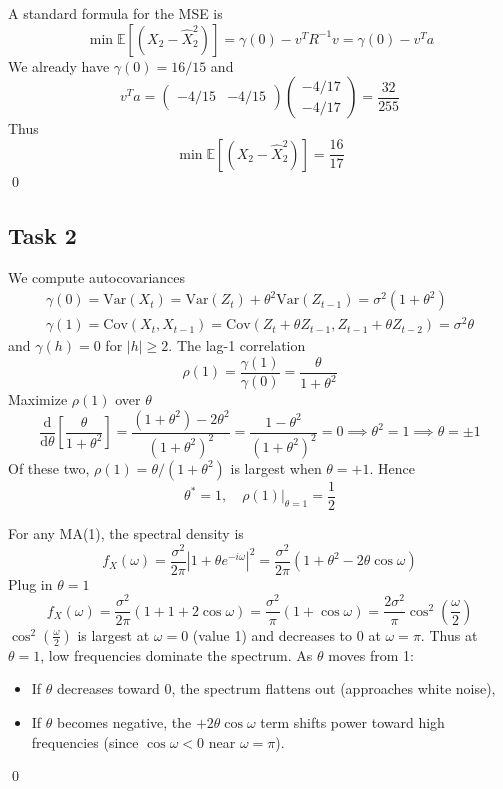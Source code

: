 \documentclass[11pt,a4paper]{article}
\newcommand{\EE}{\mathbb E}
\newcommand{\var}{\mathrm{Var}}
\newcommand{\cov}{\mathrm{Cov}}
\begin{document}
    A standard formula for the MSE is 
    \[ \min \EE [(X_2 - \hat X_2^2)] = \gamma(0) - v^T R^{-1} v = \gamma(0) - v^T a \]
    We already have $\gamma(0) = 16/15$ and
    \[ v^T a = \begin{pmatrix} -4/15 & -4/15 \end{pmatrix} \begin{pmatrix} -4/17 \\ -4/17 \end{pmatrix} = \frac{32}{255} \]
    Thus
    \[ \min \EE[(X_2 - \hat X_2^2)] = \frac{16}{17} \] \qed

    \subsection*{Task 2}
    We compute autocovariances
    \begin{align*}
        \gamma(0) = \var(X_t) = \var(Z_t) + \theta^2 \var(Z_{t-1}) = \sigma^2 (1+\theta^2) \\
        \gamma(1) = \cov(X_t, X_{t-1}) = \cov(Z_t + \theta Z_{t-1}, Z_{t-1} + \theta Z_{t-2}) = \sigma^2 \theta
    \end{align*}
    and $\gamma(h) = 0$ for $|h| \ge 2$. The lag-1 correlation
    \[ \rho(1) = \frac{\gamma(1)}{\gamma(0)} = \frac{\theta}{1+\theta^2} \]
    Maximize $\rho(1)$ over $\theta$
    \[ \frac{\mathrm d}{\mathrm d\theta} \left[ \frac{\theta}{1+\theta^2} \right] = \frac{(1+\theta^2) - 2\theta^2}{(1+\theta^2)^2} = \frac{1-\theta^2}{(1+\theta^2)^2} = 0 \implies \theta^2 = 1 \implies \theta = \pm 1 \]
    Of these two, $\rho(1) = \theta/(1+\theta^2)$ is largest when $\theta = +1$. Hence
    \[ \theta^* = 1, \quad \rho(1)\bigg|_{\theta=1} = \frac12 \]

    For any MA(1), the spectral density is
    \[ f_X(\omega) = \frac{\sigma^2}{2\pi} \left| 1+ \theta e^{-i\omega} \right|^2 = \frac{\sigma^2}{2\pi} (1+\theta^2 - 2\theta \cos \omega) \]
    Plug in $\theta = 1$
    \[ f_X(\omega) = \frac{\sigma^2}{2\pi} (1+1+2 \cos\omega) = \frac{\sigma^2}{\pi} (1+\cos \omega) = \frac{2\sigma^2}{\pi} \cos^2 \left( \frac{\omega}{2} \right) \]
    $\cos^2 \left(\frac{\omega}2\right)$ is largest at $\omega = 0$ (value 1) and decreases to 0 at $\omega = \pi$. Thus at $\theta = 1$, low frequencies dominate the spectrum. As $\theta$ moves from 1:
    \begin{itemize}
        \item If $\theta$ decreases toward $0$, the spectrum flattens out (approaches white noise),
        \item If $\theta$ becomes negative, the $+2\theta \cos \omega$ term shifts power toward high frequencies (since $\cos \omega < 0$ near $\omega = \pi$).
    \end{itemize} \qed
\end{document}
